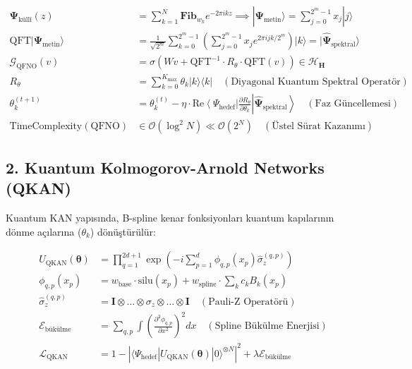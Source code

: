 \documentclass[11pt, a4paper]{article}
\begin{document}
\begin{align}
\mathbf{\Psi}_{\text{küllî}}(z) &= \sum_{k=1}^N \mathbf{Fib}_{w_k} e^{-2\pi i k z} \implies |\mathbf{\Psi}_{\text{metin}}\rangle = \sum_{j=0}^{2^m-1} x_j |j\rangle \\
\text{QFT} |\mathbf{\Psi}_{\text{metin}}\rangle &= \frac{1}{\sqrt{2^m}} \sum_{k=0}^{2^m-1} \left( \sum_{j=0}^{2^m-1} x_j e^{2\pi i j k / 2^m} \right) |k\rangle = |\hat{\mathbf{\Psi}}_{\text{spektral}}\rangle \\
\mathcal{G}_{\text{QFNO}}(v) &= \sigma \left( W v + \text{QFT}^{-1} \cdot R_\theta \cdot \text{QFT}(v) \right) \in \mathcal{H}_{\mathbf{H}} \\
R_\theta &= \sum_{k=0}^{K_{\max}} \theta_k |k\rangle \langle k| \quad (\text{Diyagonal Kuantum Spektral Operatör}) \\
\theta_k^{(t+1)} &= \theta_k^{(t)} - \eta \cdot \text{Re} \left\langle \Psi_{\text{hedef}} \right| \frac{\partial R_\theta}{\partial \theta_k} \left| \hat{\mathbf{\Psi}}_{\text{spektral}} \right\rangle \quad (\text{Faz Güncellemesi}) \\
\text{TimeComplexity}(\text{QFNO}) &\in \mathcal{O}(\log^2 N) \ll \mathcal{O}(2^N) \quad (\text{Üstel Sürat Kazanımı})
\end{align}

\subsection{2. Kuantum Kolmogorov-Arnold Networks (QKAN)}
Kuantum KAN yapısında, B-spline kenar fonksiyonları kuantum kapılarının dönme açılarına ($\theta_k$) dönüştürülür:

\begin{align}
U_{\text{QKAN}}(\bm{\theta}) &= \prod_{q=1}^{2d+1} \exp\left( -i \sum_{p=1}^d \phi_{q,p}(x_p) \hat{\sigma}_z^{(q,p)} \right) \\
\phi_{q,p}(x_p) &= w_{\text{base}} \cdot \text{silu}(x_p) + w_{\text{spline}} \cdot \sum_k c_k B_k(x_p) \\
\hat{\sigma}_z^{(q,p)} &= \mathbf{I} \otimes \dots \otimes \sigma_z \otimes \dots \otimes \mathbf{I} \quad (\text{Pauli-Z Operatörü}) \\
\mathcal{E}_{\text{bükülme}} &= \sum_{q,p} \int \left( \frac{\partial^2 \phi_{q,p}}{\partial x^2} \right)^2 dx \quad (\text{Spline Bükülme Enerjisi}) \\
\mathcal{L}_{\text{QKAN}} &= 1 - \left| \langle \Psi_{\text{hedef}} | U_{\text{QKAN}}(\bm{\theta}) |0\rangle^{\otimes N} \right|^2 + \lambda \mathcal{E}_{\text{bükülme}}
\end{align}
\end{document}
